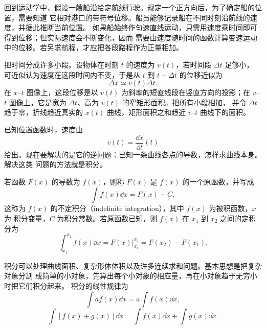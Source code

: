 回到运动学中，假设一艘船沿给定航线行驶。规定一个正方向后，为了确定船的位置，需要知道
它相对港口的带符号位移。船员能够记录船在不同时刻沿航线的速度，并据此推断当前位置。
如果船始终作匀速直线运动，只需用速度乘时间即可得到位移；但实际速度会不断变化，因而
需要由速度随时间的函数计算变速运动中的位移。若另求航程，才应把各段路程作为正量相加。

\partitionDiagram

把时间分成许多小段。设物体在时刻 $t$ 的速度为 $v(t)$，若时间段 $\Delta t$ 足够小，
可近似认为速度在这段时间内不变，于是从 $t$ 到 $t+\Delta t$ 的位移近似为
\begin{equation}
 \Delta x\simeq v(t)\Delta t.
\end{equation}
在 $x$--$t$ 图像上，这段位移是以 $v(t)$ 为斜率的短直线段在竖直方向的投影；在
$v$--$t$ 图像上，它是宽为 $\Delta t$、高为 $v(t)$ 的窄矩形面积。把所有小段相加，
并令 $\Delta t$ 趋于零，折线趋近真实的 $x(t)$ 曲线，矩形面积之和趋近 $v$--$t$
曲线下的面积。

已知位置函数时，速度由
\begin{equation}
 v(t)=\frac{\dd x}{\dd t}(t)
\end{equation}
给出。现在要解决的是它的逆问题：已知一条曲线各点的导数，怎样求曲线本身。解决这类
问题的方法就是积分。

若函数 $F(x)$ 的导数为 $f(x)$，则称 $F(x)$ 是 $f(x)$ 的一个原函数，并写成
\begin{equation}
 \int f(x)\dd x=F(x)+C,
\end{equation}
这称为 $f(x)$ 的不定积分（indefinite integration），其中 $f(x)$ 为被积函数，$x$ 为
积分变量，$C$ 为积分常数。若原函数已知，则 $f(x)$ 在 $x_1$ 到 $x_2$ 之间的定积分为
\begin{equation}
 \int_{x_1}^{x_2}f(x)\dd x
 =\left.F(x)\right|_{x_1}^{x_2}=F(x_2)-F(x_1).
\end{equation}

\integralDiagram

积分可以处理曲线面积、复杂形体体积以及许多连续求和问题。基本思想是把复杂对象分割
成简单的小对象，先算出每个小对象的相应量，再在小对象趋于无穷小时把它们积分起来。
积分的线性规律为
\begin{equation}
 \int af(x)\dd x=a\int f(x)\dd x,
\end{equation}
\begin{equation}
 \int[f(x)+g(x)]\dd x
 =\int f(x)\dd x+\int g(x)\dd x.
\end{equation}

\Needspace{0.32\textheight}


